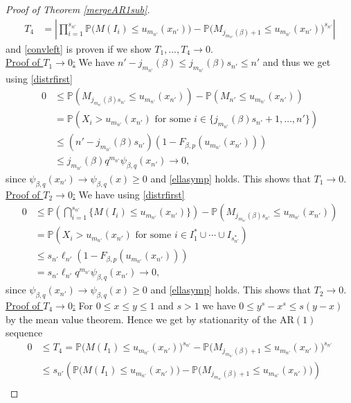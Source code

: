 \documentclass[12pt]{amsart}
\theoremstyle{definition}
\theoremstyle{remark}
\newcommand{\AR}{\operatorname{AR(1)}}
\newcommand{\Pm}{{\mathbb P}}
\numberwithin{equation}{section}
\begin{document}
\begin{proof}[Proof of Theorem \ref{mergeAR1sub}]
\begin{align*}
T_{4} & =\left|\prod_{i=1}^{s_{n'}}\Pm\big(M(I_{i})\leq u_{m_{n'}}(x_{n'})\big)-\Pm\big(M_{j_{m_{n'}}(\beta)+1}\leq u_{m_{n'}}(x_{n'})\big)^{s_{n'}}\right|
\end{align*}
and \eqref{convleft} is proven if we show $T_{1},\ldots,T_{4}\to0$.\\[1ex]
\underline{Proof of $T_{1}\to0$:} We have $n'-j_{m_{n'}}(\beta)\leq j_{m_{n'}}(\beta)s_{n'}\leq n'$ and thus we get using \eqref{distrfirst}
\begin{align*}
0 & \leq \Pm(M_{j_{m_{n'}}(\beta)s_{n'}}\leq u_{m_{n'}}(x_{n'}))-\Pm(M_{n'}\leq u_{m_{n'}}(x_{n'}))\\
& =\Pm(X_{i}>u_{m_{n'}}(x_{n'})\text{ for some }i\in\{j_{m_{n'}}(\beta)s_{n'}+1,\ldots,n'\})\\
& \leq(n'-j_{m_{n'}}(\beta)s_{n'})(1-F_{\beta,p}(u_{m_{n'}}(x_{n'})))\\
&\leq j_{m_{n'}}(\beta)q^{m_{n'}}\psi_{\beta,q}(x_{n'})\to0,
\end{align*}
since $\psi_{\beta,q}(x_{n'})\to\psi_{\beta,q}(x)\geq0$ and \eqref{ellasymp} holds. This shows that $T_{1}\to0$.\\[1ex]
\underline{Proof of $T_{2}\to0$:} We have using \eqref{distrfirst}
\begin{align*}
0 & \leq\Pm\left(\bigcap_{i=1}^{s_{n'}}\{M(I_{i})\leq u_{m_{n'}}(x_{n'})\}\right)-\Pm(M_{j_{m_{n'}}(\beta)s_{n'}}\leq u_{m_{n'}}(x_{n'}))\\
& =\Pm\left(X_{i}>u_{m_{n'}}(x_{n'})\text{ for some }i\in I_{1}^{\ast}\cup\cdots\cup I_{s_{n'}^{\ast}}\right)\\
& \leq s_{n'}\ell_{n'}(1-F_{\beta,p}(u_{m_{n'}}(x_{n'})))\\
& = s_{n'}\ell_{n'}q^{m_{n'}}\psi_{\beta,q}(x_{n'})\to0,
\end{align*}
since $\psi_{\beta,q}(x_{n'})\to\psi_{\beta,q}(x)\geq0$ and \eqref{ellasymp} holds. This shows that $T_{2}\to0$.\\[1ex]
\underline{Proof of $T_{4}\to0$:} For $0\leq x\leq y\leq1$ and $s>1$ we have $0\leq y^{s}-x^{s}\leq s(y-x)$ by the mean value theorem. Hence we get by stationarity of the $\AR$ sequence
\begin{align*}
0 & \leq T_{4}=\Pm\big(M(I_{1})\leq u_{m_{n'}}(x_{n'})\big)^{s_{n'}}-\Pm\big(M_{j_{m_{n'}}(\beta)+1}\leq u_{m_{n'}}(x_{n'})\big)^{s_{n'}}\\
& \leq s_{n'}\left(\Pm\big(M(I_{1})\leq u_{m_{n'}}(x_{n'})\big)-\Pm\big(M_{j_{m_{n'}}(\beta)+1}\leq u_{m_{n'}}(x_{n'})\big)\right)\\

\end{align*}
\end{proof}
\end{document}
